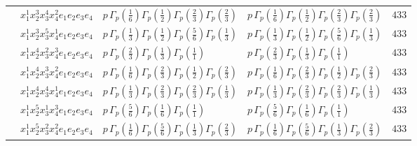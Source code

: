 \documentclass[11pt]{article}
\begin{document}
\begin{table}[ht]
{\begin{tabular}{@{}lllll@{}}
 & $x_{1}^{1} x_{2}^{3} x_{3}^{4} x_{4}^{2}  e_{1} e_{2} e_{3} e_{4}$ & $p \, \Gamma_p \left( \frac{1}{6} \right) \Gamma_p \left( \frac{1}{2} \right) \Gamma_p \left( \frac{2}{3} \right) \Gamma_p \left( \frac{2}{3} \right)$ & $p \, \Gamma_p \left( \frac{1}{6} \right) \Gamma_p \left( \frac{1}{2} \right) \Gamma_p \left( \frac{2}{3} \right) \Gamma_p \left( \frac{2}{3} \right)$ & $433$ \\
 & $x_{1}^{1} x_{2}^{3} x_{3}^{5} x_{4}^{1}  e_{1} e_{2} e_{3} e_{4}$ & $p \, \Gamma_p \left( \frac{1}{3} \right) \Gamma_p \left( \frac{1}{2} \right) \Gamma_p \left( \frac{5}{6} \right) \Gamma_p \left( \frac{1}{3} \right)$ & $p \, \Gamma_p \left( \frac{1}{3} \right) \Gamma_p \left( \frac{1}{2} \right) \Gamma_p \left( \frac{5}{6} \right) \Gamma_p \left( \frac{1}{3} \right)$ & $433$ \\
 & $x_{1}^{1} x_{2}^{4} x_{3}^{2} x_{4}^{3}  e_{1} e_{2} e_{3} e_{4}$ & $p \, \Gamma_p \left( \frac{2}{3} \right) \Gamma_p \left( \frac{1}{3} \right) \Gamma_p \left( \frac{1}{1} \right)$ & $p \, \Gamma_p \left( \frac{2}{3} \right) \Gamma_p \left( \frac{1}{3} \right) \Gamma_p \left( \frac{1}{1} \right)$ & $433$ \\
 & $x_{1}^{1} x_{2}^{4} x_{3}^{3} x_{4}^{2}  e_{1} e_{2} e_{3} e_{4}$ & $p \, \Gamma_p \left( \frac{1}{6} \right) \Gamma_p \left( \frac{2}{3} \right) \Gamma_p \left( \frac{1}{2} \right) \Gamma_p \left( \frac{2}{3} \right)$ & $p \, \Gamma_p \left( \frac{1}{6} \right) \Gamma_p \left( \frac{2}{3} \right) \Gamma_p \left( \frac{1}{2} \right) \Gamma_p \left( \frac{2}{3} \right)$ & $433$ \\
 & $x_{1}^{1} x_{2}^{4} x_{3}^{4} x_{4}^{1}  e_{1} e_{2} e_{3} e_{4}$ & $p \, \Gamma_p \left( \frac{1}{3} \right) \Gamma_p \left( \frac{2}{3} \right) \Gamma_p \left( \frac{2}{3} \right) \Gamma_p \left( \frac{1}{3} \right)$ & $p \, \Gamma_p \left( \frac{1}{3} \right) \Gamma_p \left( \frac{2}{3} \right) \Gamma_p \left( \frac{2}{3} \right) \Gamma_p \left( \frac{1}{3} \right)$ & $433$ \\
 & $x_{1}^{1} x_{2}^{5} x_{3}^{1} x_{4}^{3}  e_{1} e_{2} e_{3} e_{4}$ & $p \, \Gamma_p \left( \frac{5}{6} \right) \Gamma_p \left( \frac{1}{6} \right) \Gamma_p \left( \frac{1}{1} \right)$ & $p \, \Gamma_p \left( \frac{5}{6} \right) \Gamma_p \left( \frac{1}{6} \right) \Gamma_p \left( \frac{1}{1} \right)$ & $433$ \\
 & $x_{1}^{1} x_{2}^{5} x_{3}^{2} x_{4}^{2}  e_{1} e_{2} e_{3} e_{4}$ & $p \, \Gamma_p \left( \frac{1}{6} \right) \Gamma_p \left( \frac{5}{6} \right) \Gamma_p \left( \frac{1}{3} \right) \Gamma_p \left( \frac{2}{3} \right)$ & $p \, \Gamma_p \left( \frac{1}{6} \right) \Gamma_p \left( \frac{5}{6} \right) \Gamma_p \left( \frac{1}{3} \right) \Gamma_p \left( \frac{2}{3} \right)$ & $433$ \\

\end{tabular}}
\end{table}
\end{document}

